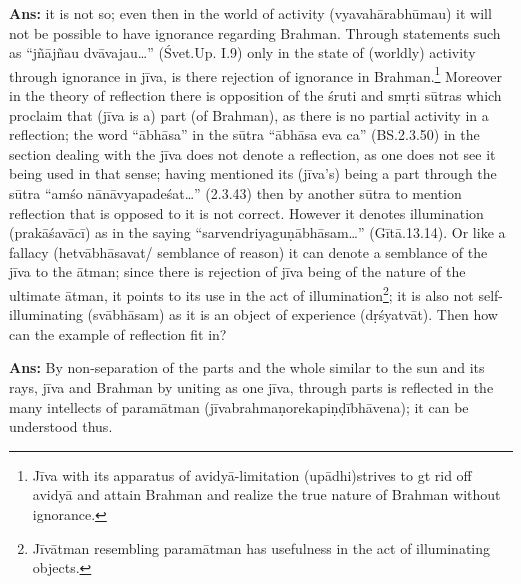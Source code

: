 \textbf{Ans:} it is not so; even then in the world of activity (vyavahārabhūmau) it will not be possible to have ignorance regarding Brahman.  Through statements such as “jñājñau dvāvajau…” (Śvet.Up. I.9) only in the state of (worldly) activity through ignorance in jīva, is there rejection of ignorance in Brahman.\footnote{Jīva with its apparatus of avidyā-limitation (upādhi)strives to gt rid off avidyā and attain Brahman and realize the true nature of Brahman without ignorance.} Moreover in the theory of reflection there is opposition of the śruti and smṛti sūtras which proclaim that (jīva is a) part (of Brahman), as there is no partial activity in a reflection;  the word “ābhāsa” in the sūtra “ābhāsa eva ca” (BS.2.3.50) in the section dealing with the jīva does not denote a reflection, as one does not see it being used in that sense; having mentioned its (jīva’s) being a part through the sūtra “amśo nānāvyapadeśat…” (2.3.43) then by another sūtra to mention reflection that is opposed to it is not correct. However it denotes illumination (prakāśavācī) as in the saying “sarvendriyaguṇābhāsam…” (Gītā.13.14). Or like a fallacy (hetvābhāsavat/ semblance of reason) it can denote a semblance of the jīva to the ātman;  since there is rejection of jīva being of the nature of the ultimate ātman, it points to its use in the act of illumination\footnote{Jīvātman resembling paramātman has usefulness in the act of illuminating objects.}; it is also not self-illuminating (svābhāsam) as it is an object of experience (dṛśyatvāt).   Then how can the example of reflection fit in? 

\vskip 3pt

\textbf{Ans:} By non-separation of the parts and the whole similar to the sun and its rays, jīva and Brahman by uniting as one jīva, through parts is reflected in the many intellects of paramātman (jīvabrahmaṇorekapiṇḍībhāvena); it can be understood thus.

\vskip 3pt


